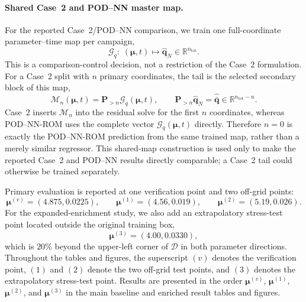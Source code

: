 \documentclass[11pt]{article}
\begin{document}
\paragraph{Shared Case~2 and POD--NN master map.}
For the reported Case~2/POD--NN comparison, we train one full-coordinate
parameter--time map per campaign,
\begin{equation}
\mathcal G_q:\; (\bm\mu,t)\longmapsto
\widehat{\mathbf q}_N\in\mathbb R^{n_{\mathrm{tot}}}.
\label{eq:master-q-map}
\end{equation}
This is a comparison-control decision, not a restriction of the Case~2
formulation. For a Case~2 split with $n$ primary coordinates, the tail is the
selected secondary block of this map,
\begin{equation}
\mathcal M_n(\bm\mu,t)
=\mathbf P_{>n}\mathcal G_q(\bm\mu,t),
\qquad
\mathbf P_{>n}\widehat{\mathbf q}_N
=\widehat{\bar{\mathbf q}}\in\mathbb R^{n_{\mathrm{tot}}-n}.
\label{eq:case2-master-tail}
\end{equation}
Case~2 inserts $\mathcal M_n$ into the residual solve for the first $n$
coordinates, whereas POD--NN-ROM uses the complete vector
$\mathcal G_q(\bm\mu,t)$ directly. Therefore $n=0$ is exactly the
POD--NN-ROM prediction from the same trained map, rather than a merely similar
regressor. This shared-map construction is used only to make the reported
Case~2 and POD--NN results directly comparable; a Case~2 tail could otherwise
be trained separately.

Primary evaluation is reported at one verification point and two off-grid
points:
\begin{equation}
\bm\mu^{(v)}=(4.875,0.0225),\qquad
\bm\mu^{(1)}=(4.56,0.019),\qquad
\bm\mu^{(2)}=(5.19,0.026).
\end{equation}
For the expanded-enrichment study, we also add an extrapolatory stress-test
point located outside the original training box,
\begin{equation}
\bm\mu^{(3)}=(4.00,0.0330),
\end{equation}
which is $20\%$ beyond the upper-left corner of $\mathcal D$ in both parameter
directions. Throughout the tables and figures, the superscript $(v)$ denotes
the verification point, $(1)$ and $(2)$ denote the two off-grid test points,
and $(3)$ denotes the extrapolatory stress-test point. Results are presented in
the order $\bm\mu^{(v)}$, $\bm\mu^{(1)}$, $\bm\mu^{(2)}$, and
$\bm\mu^{(3)}$ in the main baseline and enriched result tables and figures.
\end{document}
